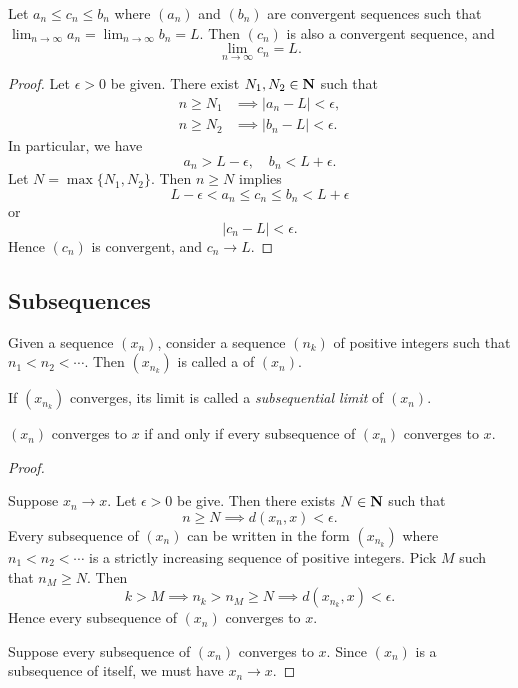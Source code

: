 \begin{proposition}
Let $a_n\le c_n\le b_n$ where $(a_n)$ and $(b_n)$ are convergent sequences such that $\displaystyle\lim_{n\to\infty}a_n=\lim_{n\to\infty}b_n=L$. Then $(c_n)$ is also a convergent sequence, and
\[\lim_{n\to\infty}c_n=L.\]
\end{proposition}

\begin{proof}
Let $\epsilon>0$ be given. There exist $N_1,N_2\in\mathbf N$ such that
\begin{align*}
n\ge N_1&\implies|a_n-L|<\epsilon,\\
n\ge N_2&\implies|b_n-L|<\epsilon.
\end{align*}
In particular, we have
\[a_n>L-\epsilon,\quad b_n<L+\epsilon.\]
Let $N=\max\{N_1,N_2\}$. Then $n\ge N$ implies
\[L-\epsilon<a_n\le c_n\le b_n<L+\epsilon\]
or
\[|c_n-L|<\epsilon.\]
Hence $(c_n)$ is convergent, and $c_n\to L$.
\end{proof}

\subsection{Subsequences}
\begin{definition}[Subsequence]
Given a sequence $(x_n)$, consider a sequence $(n_k)$ of positive integers such that $n_1<n_2<\cdots$. Then $(x_{n_k})$ is called a  of $(x_n)$.

If $(x_{n_k})$ converges, its limit is called a \emph{subsequential limit} of $(x_n)$.
\end{definition}

\begin{proposition}
$(x_n)$ converges to $x$ if and only if every subsequence of $(x_n)$ converges to $x$.
\end{proposition}

\begin{proof} \

\fbox{$\implies$} Suppose $x_n\to x$. Let $\epsilon>0$ be give. Then there exists $N\in\mathbf N$ such that
\[n\ge N\implies d(x_n,x)<\epsilon.\]
Every subsequence of $(x_n)$ can be written in the form $(x_{n_k})$ where $n_1<n_2<\cdots$ is a strictly increasing sequence of positive integers. Pick $M$ such that $n_M\ge N$. Then
\[k>M\implies n_k>n_M\ge N\implies d(x_{n_k},x)<\epsilon.\]
Hence every subsequence of $(x_n)$ converges to $x$.

\fbox{$\impliedby$} Suppose every subsequence of $(x_n)$ converges to $x$. Since $(x_n)$ is a subsequence of itself, we must have $x_n\to x$.
\end{proof}

